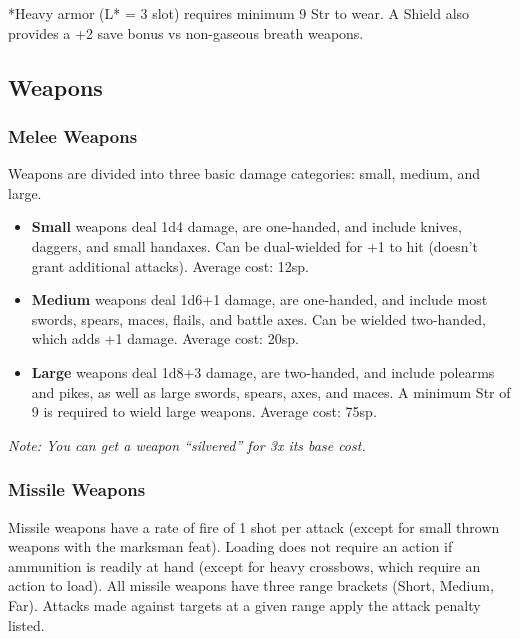 \documentclass{article}
\begin{document}
\begin{multicols}{2}
*Heavy armor (L* = 3 slot) requires minimum 9 Str to wear. A Shield also
provides a +2 save bonus vs non-gaseous breath weapons.

\subsection{Weapons}\label{weapons}

\subsubsection{Melee Weapons}\label{melee-weapons}

Weapons are divided into three basic damage categories: small, medium,
and large.

\begin{itemize}
\tightlist
\item
  \textbf{Small} weapons deal 1d4 damage, are one-handed, and include
  knives, daggers, and small handaxes. Can be dual-wielded for +1 to hit
  (doesn't grant additional attacks). Average cost: 12sp.
\item
  \textbf{Medium} weapons deal 1d6+1 damage, are one-handed, and include
  most swords, spears, maces, flails, and battle axes. Can be wielded
  two-handed, which adds +1 damage. Average cost: 20sp.
\item
  \textbf{Large} weapons deal 1d8+3 damage, are two-handed, and include
  polearms and pikes, as well as large swords, spears, axes, and maces.
  A minimum Str of 9 is required to wield large weapons. Average cost:
  75sp.
\end{itemize}

\emph{Note: You can get a weapon ``silvered'' for 3x its base cost.}

\subsubsection{Missile Weapons}\label{missile-weapons}

Missile weapons have a rate of fire of 1 shot per attack (except for
small thrown weapons with the marksman feat). Loading does not require
an action if ammunition is readily at hand (except for heavy crossbows,
which require an action to load). All missile weapons have three range
brackets (Short, Medium, Far). Attacks made against targets at a given
range apply the attack penalty listed.


\end{multicols}
\end{document}
